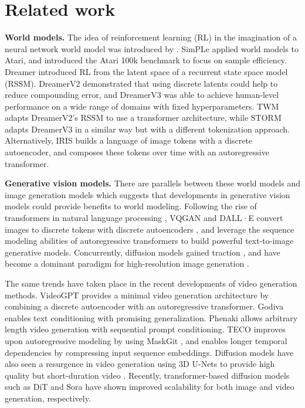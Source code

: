 \section{Related work}
\label{sec:related_work}

\textbf{World models.} The idea of reinforcement learning (RL) in the imagination of a neural network world model was introduced by \citet{ha2018world}. SimPLe \citep{kaiser2019atari100k} applied world models to Atari, and introduced the Atari 100k benchmark to focus on sample efficiency. Dreamer \citep{hafner2020dream} introduced RL from the latent space of a recurrent state space model (RSSM). DreamerV2 \citep{hafner2021mastering} demonstrated that using discrete latents could help to reduce compounding error, and DreamerV3 \citep{hafner2023dreamerv3} was able to achieve human-level performance on a wide range of domains with fixed hyperparameters. TWM \citep{robine2023transformer} adapts DreamerV2's RSSM to use a transformer architecture, while STORM \citep{zhang2023storm} adapts DreamerV3 in a similar way but with a different tokenization approach. Alternatively, IRIS \citep{iris2023} builds a language of image tokens with a discrete autoencoder, and composes these tokens over time with an autoregressive transformer. 

\textbf{Generative vision models.} There are parallels between these world models and image generation models which suggests that developments in generative vision models could provide benefits to world modeling. Following the rise of transformers in natural language processing \citep{vaswani2017attention,devlin2018bert,radford2019language}, VQGAN \citep{esser2021taming} and DALL·E \citep{ramesh2021zero} convert images to discrete tokens with discrete autoencoders \citep{vqvae}, and leverage the sequence modeling abilities of autoregressive transformers to build powerful text-to-image generative models. Concurrently, diffusion models \citep{sohl2015difforigin,ho2020DDPM,song_sde} gained traction \citep{dhariwal2021diffbeatsgans,ldm_stable_diffusion}, and have become a dominant paradigm for high-resolution image generation \citep{saharia2022imagen,ramesh2022hierarchical,podell2023sdxl}.

The same trends have taken place in the recent developments of video generation methods. VideoGPT \citep{yan2021videogpt} provides a minimal video generation architecture by combining a discrete autoencoder with an autoregressive transformer. Godiva \citep{wu2021godiva} enables text conditioning with promising generalization. Phenaki \citep{phenaki} allows arbitrary length video generation with sequential prompt conditioning. TECO \citep{yan2023teco} improves upon autoregressive modeling by using MaskGit \citep{chang2022maskgit}, and enables longer temporal dependencies by compressing input sequence embeddings. Diffusion models have also seen a resurgence in video generation using 3D U-Nets to provide high quality but short-duration video \citep{singer2023make,bar2024lumiere}. 
Recently, transformer-based diffusion models such as DiT  \citep{dit2023} and Sora \citep{sora2024} have shown improved scalability for both image and video generation, respectively.

